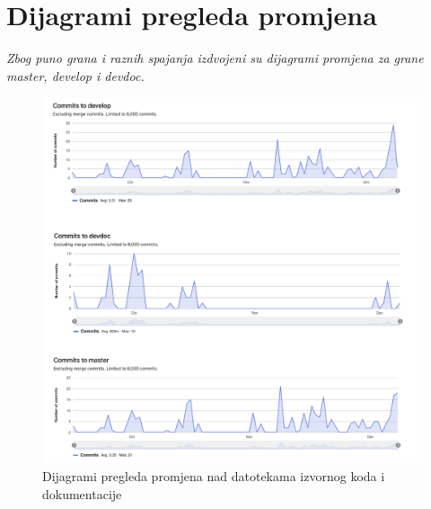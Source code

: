 					
		\eject
		\section*{Dijagrami pregleda promjena}
		
		
		\textit{Zbog puno grana i raznih spajanja izdvojeni su dijagrami promjena za grane master, develop i devdoc. }
		
			\begin{figure}[H]
			\centering
			\includegraphics[width=\textwidth]{slike/dijagram_promjena.png}
			\caption{Dijagrami pregleda promjena nad datotekama izvornog koda i dokumentacije}
			\label{fig:my_label}
		\end{figure}
		
	